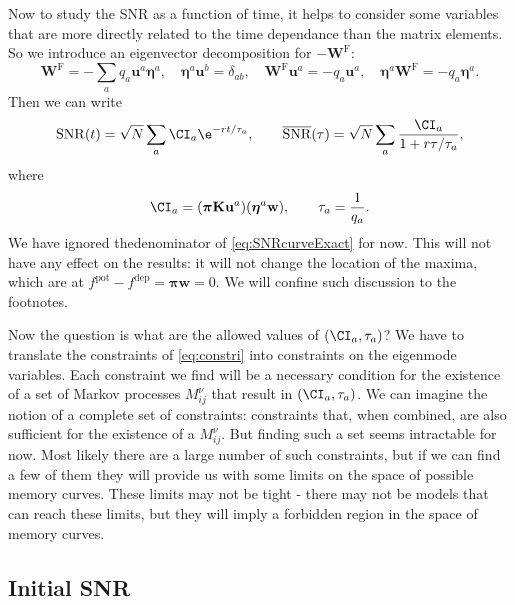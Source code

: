 \documentclass[12pt]{article}
\newcommand{\eqm}{\pi}
\newcommand{\eq}{\boldsymbol{\eqm}}
\newcommand{\wm}{w}
\newcommand{\w}{\mathbf{\wm}}
\newcommand{\Wm}{W}
\newcommand{\W}{\mathbf{\Wm}}
\newcommand{\MMdm}{M}
\newcommand{\encm}{K}
\newcommand{\enc}{\mathbf{\encm}}
\newcommand{\frg}{\W^{\mathrm{F}}}
\newcommand{\evrm}{u}
\newcommand{\evr}{\mathbf{\evrm}}
\newcommand{\evlm}{\eta}
\newcommand{\evl}{\boldsymbol{\evlm}}
\newcommand{\pot}{^{\text{pot}}}
\newcommand{\dep}{^{\text{dep}}}
\DeclareMathOperator{\snr}{SNR}
\newcommand{\snrb}{\overline{\snr}}
\begin{document}
Now to study the SNR as a function of  time, it helps to consider some variables that are more directly related to the time dependance than the matrix elements. 
So we introduce an eigenvector decomposition for \(-\frg\):
%
\begin{equation}\label{eq:eigendecomp}
  \frg = - \sum_a q_a \evr^a \evl^a,
  \quad
  \evl^a \evr^b = \delta_{ab},
  \quad
  \frg \evr^a = -q_a \evr^a,
  \quad
  \evl^a \frg = -q_a \evl^a.
\end{equation}
%
Then we can write
%
\begin{equation}\label{eq:snreig}
  \snr(t) = \sqrt{N}\sum_a \CI_a \e^{-rt/\tau_a},
  \qquad
  \snrb(\tau) = \sqrt{N}\sum_a \frac{\CI_a}{1+r\tau/\tau_a},
\end{equation}
%
where
%
\begin{equation}\label{eq:snrcoeffs}
  \CI_a = (\eq \enc \evr^a) (\evl^a \w),
  \qquad
  \tau_a = \frac{1}{q_a}.
\end{equation}
%
We have ignored thedenominator of \cref{eq:SNRcurveExact} for now.
This will not have any effect on the results: it will not change the location of the maxima, which are at \( f\pot - f\dep = \eq \w = 0 \).
We will confine such discussion to the footnotes.

Now the question is what are the allowed values of \( (\CI_a, \tau_a) \)?
We have to translate the constraints of \cref{eq:constri} into constraints on the eigenmode variables.
Each constraint we find will be a necessary condition for the existence of a set of Markov processes \( \MMdm_{ij}^\nu \) that result in \( (\CI_a, \tau_a) \).
We can imagine the notion of a complete set of constraints: constraints that, when combined, are also sufficient for the existence of a \( \MMdm_{ij}^\nu \).
But finding such a set seems intractable for now.
Most likely there are a large number of such constraints, but if we can find a few of them they will provide us with some limits on the space of possible memory curves.
These limits may not be tight - there may not be models that can reach these limits, but they will imply a forbidden region in the space of memory curves.



\subsection{Initial SNR}\label{sec:initial}
\end{document}
